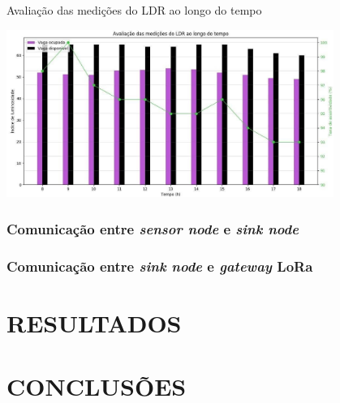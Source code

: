 \documentclass[oneside,openright,12pt]{ufsm_2015} %
\begin{document}
    \begin{grafico}[H]
     	    \caption{\label{exepretex} Avaliação das medições do LDR ao longo do tempo}
            \centering
            \includegraphics[width=0.8\textwidth]{figuras/ldr_graph.jpg}
            \vspace{\baselineskip} %
            \label{graph:ldr-aval}
    \end{grafico}
    
    \subsection{Comunicação entre \textit{sensor node} e \textit{sink node}}
    
    \subsection{Comunicação entre \textit{sink node} e \textit{gateway} LoRa}
    
    
\chapter{RESULTADOS}




\chapter{CONCLUSÕES}
	 

        



\end{document}
